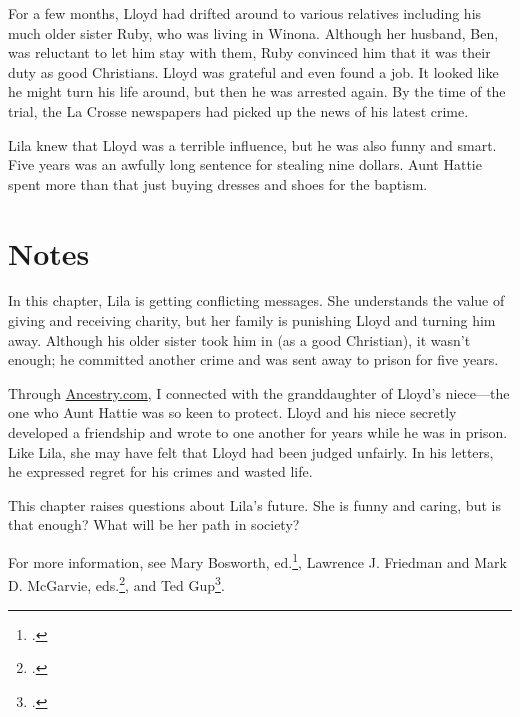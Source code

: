 \documentclass[
  letterpaper,
]{book}
\begin{document}
For a few months, Lloyd had drifted around to various relatives
including his much older sister Ruby, who was living in Winona. Although
her husband, Ben, was reluctant to let him stay with them, Ruby
convinced him that it was their duty as good Christians. Lloyd was
grateful and even found a job. It looked like he might turn his life
around, but then he was arrested again. By the time of the trial, the La
Crosse newspapers had picked up the news of his latest crime.

Lila knew that Lloyd was a terrible influence, but he was also funny and
smart. Five years was an awfully long sentence for stealing nine
dollars. Aunt Hattie spent more than that just buying dresses and shoes
for the baptism.

\section{Notes}\label{notes-16}

In this chapter, Lila is getting conflicting messages. She understands
the value of giving and receiving charity, but her family is punishing
Lloyd and turning him away. Although his older sister took him in (as a
good Christian), it wasn't enough; he committed another crime and was
sent away to prison for five years.

Through \href{https://www.ancestry.com/}{Ancestry.com}, I connected with
the granddaughter of Lloyd's niece---the one who Aunt Hattie was so keen
to protect. Lloyd and his niece secretly developed a friendship and
wrote to one another for years while he was in prison. Like Lila, she
may have felt that Lloyd had been judged unfairly. In his letters, he
expressed regret for his crimes and wasted life.

This chapter raises questions about Lila's future. She is funny and
caring, but is that enough? What will be her path in society?

For more information, see Mary Bosworth, ed.\footnote{.}, Lawrence J. Friedman and Mark D.
McGarvie, eds.\footnote{.}, and Ted Gup\footnote{.}.
\end{document}
